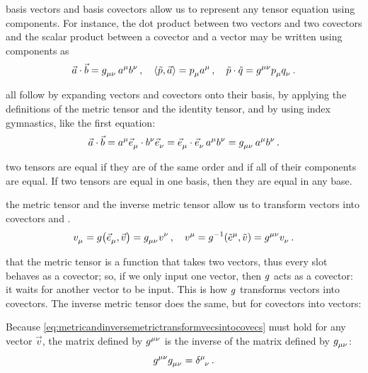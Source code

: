  basis vectors and basis covectors allow us to represent any tensor equation using components. For instance, the dot product between two vectors and two covectors and the scalar product between a covector and a vector may be written using components as
%
\begin{equation}\label{eq:dotproductscalarproductincomponents}
  \vec a\iprod\vec b = \tmetric\mu\nu\,\tvec a\mu\tvec b\nu\,,\quad
  \sprod{\cov p}{\vec a} = \tcov p\mu\tvec a\mu\,,\quad
  \cov p\iprod\cov q = \tinvmet\mu\nu\tcov p\mu\tcov q\nu\,.
\end{equation}

 all follow by expanding vectors and covectors onto their basis, by applying the definitions of the metric tensor and the identity tensor, and by using index gymnastics, like the first equation:
%
\begin{equation*}
  \vec a\iprod\vec b = \tvec a\mu\tbvec\mu\iprod\tvec b\nu\tbvec\nu
                     = \tbvec\mu\iprod\tbvec\nu\,\tvec a\mu\tvec b\nu
                     = \tmetric\mu\nu\,\tvec a\mu\tvec b\nu\,.
\end{equation*}

 two tensors are equal if they are of the same order and if all of their components are equal. If two tensors are equal in one basis, then they are equal in any base.

 the metric tensor and the inverse metric tensor allow us to transform vectors into covectors and \vicvers.
%
\begin{equation}\label{eq:metricandinversemetrictransformvecsintocovecs}
  \tcov v\mu = \metric\vat{\tbvec\mu, \vec v} = \tmetric\mu\nu\tvec v\nu\,,\quad
  \tvec v\mu = \invmet\vat{\tbcov\mu, \cov v} = \tinvmet\mu\nu\tcov v\nu\,.
\end{equation}

 that the metric tensor is a function that takes two vectors, thus every slot behaves as a covector; so, if we only input one vector, then $g$ acts as a covector: it waits for another vector to be input. This is how $g$ transforms vectors into covectors. The inverse metric tensor does the same, but for covectors into vectors:

Because \cref{eq:metricandinversemetrictransformvecsintocovecs} must hold for any vector $\vec v$, the matrix defined by $\tinvmet\mu\nu$ is the inverse of the matrix defined by $\tmetric\mu\nu$:
%
\begin{equation}\label{eq:metricandinversemetricrelationship}
  \tinvmet\mu\nu\tmetric\mu\nu = \tkron\mu\nu\,.
\end{equation}

